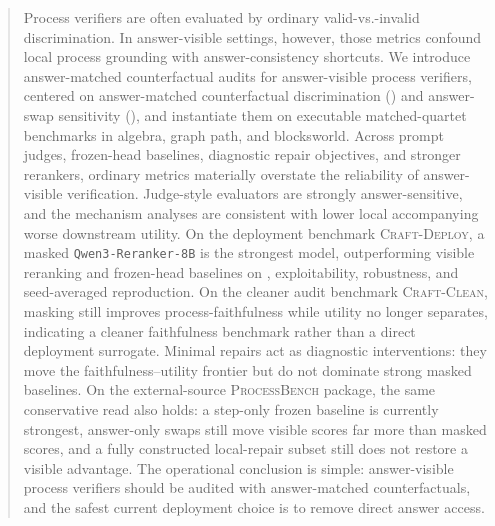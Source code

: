 \begin{abstract}
Process verifiers are often evaluated by ordinary valid-vs.-invalid
discrimination. In answer-visible settings, however, those metrics confound
local process grounding with answer-consistency shortcuts. We introduce
answer-matched counterfactual audits for answer-visible process verifiers,
centered on answer-matched counterfactual discrimination (\amcd) and
answer-swap sensitivity (\ass), and instantiate them on executable
matched-quartet benchmarks in algebra, graph path, and blocksworld. Across
prompt judges, frozen-head baselines, diagnostic repair objectives, and
stronger rerankers, ordinary metrics materially overstate the reliability of
answer-visible verification. Judge-style evaluators are strongly
answer-sensitive, and the mechanism analyses are consistent with lower local
\amcd{} accompanying worse downstream utility. On the deployment benchmark
\textsc{Craft-Deploy}, a masked \texttt{Qwen3-Reranker-8B} is the strongest
model, outperforming visible reranking and frozen-head baselines on \amcd{},
exploitability, robustness, and seed-averaged reproduction. On the cleaner
audit benchmark \textsc{Craft-Clean}, masking still improves
process-faithfulness while utility no longer separates, indicating a cleaner
faithfulness benchmark rather than a direct deployment surrogate. Minimal
repairs act as diagnostic interventions: they move the
faithfulness--utility frontier but do not dominate strong masked baselines.
On the external-source \textsc{ProcessBench} package, the same conservative
read also holds: a step-only frozen baseline is currently strongest,
answer-only swaps still move visible scores far more than masked scores, and a
fully constructed local-repair subset still does not restore a visible
advantage.
The operational conclusion is simple: answer-visible process verifiers should
be audited with answer-matched counterfactuals, and the safest current
deployment choice is to remove direct answer access.
\end{abstract}
